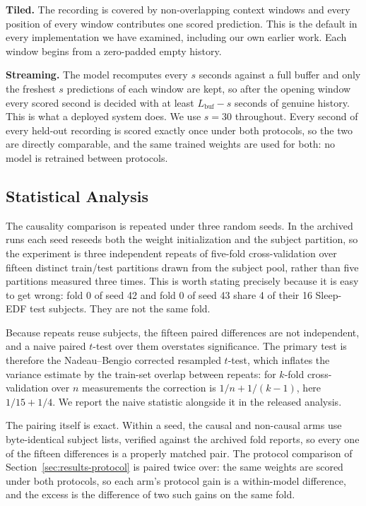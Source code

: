 \documentclass[conference]{IEEEtran}
\begin{document}
\textbf{Tiled.} The recording is covered by non-overlapping context windows and every position of
every window contributes one scored prediction. This is the default in every implementation we have
examined, including our own earlier work. Each window begins from a zero-padded empty history.

\textbf{Streaming.} The model recomputes every $s$ seconds against a full buffer and only the
freshest $s$ predictions of each window are kept, so after the opening window every scored second is
decided with at least $L_{\text{buf}} - s$ seconds of genuine history. This is what a deployed
system does. We use $s = 30$ throughout. Every second of every held-out recording is scored exactly
once under both protocols, so the two are directly comparable, and the same trained weights are used
for both: no model is retrained between protocols.

\subsection{Statistical Analysis}
\label{sec:stats}

The causality comparison is repeated under three random seeds. In the archived runs each seed
reseeds both the weight initialization and the subject partition, so the experiment is three
independent repeats of five-fold cross-validation over fifteen distinct train/test partitions drawn
from the subject pool, rather than five partitions measured three times. This is worth stating
precisely because it is easy to get wrong: fold 0 of seed 42 and fold 0 of seed 43 share 4 of their
16 Sleep-EDF test subjects. They are not the same fold.

Because repeats reuse subjects, the fifteen paired differences are not independent, and a naive
paired $t$-test over them overstates significance. The primary test is therefore the Nadeau--Bengio
corrected resampled $t$-test, which inflates the variance estimate by the train-set overlap between
repeats: for $k$-fold cross-validation over $n$ measurements the correction is $1/n + 1/(k-1)$,
here $1/15 + 1/4$. We report the naive statistic alongside it in the released analysis.

The pairing itself is exact. Within a seed, the causal and non-causal arms use byte-identical
subject lists, verified against the archived fold reports, so every one of the fifteen differences
is a properly matched pair. The protocol comparison of Section~\ref{sec:results-protocol} is paired
twice over: the same weights are scored under both protocols, so each arm's protocol gain is a
within-model difference, and the excess is the difference of two such gains on the same fold.
\end{document}
